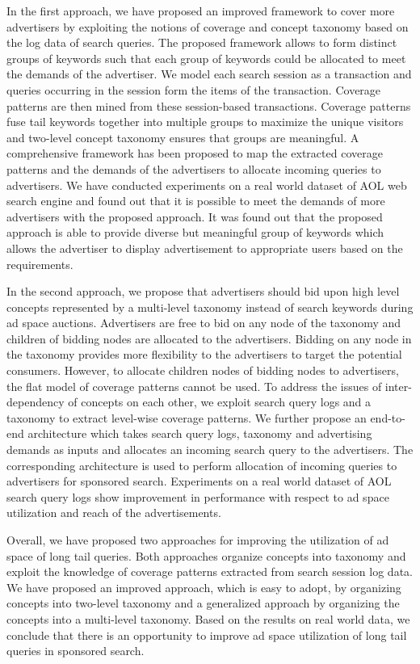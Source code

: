In the first approach, we have proposed an improved framework to cover more advertisers  by exploiting the notions of coverage and concept taxonomy based on the log data of search queries. The proposed framework allows to form distinct groups of keywords such that each group of keywords could be allocated to meet the demands of the advertiser. We model each search session as a transaction and queries occurring in the session form the items of the transaction. Coverage patterns are then mined from these session-based transactions. Coverage patterns fuse tail keywords together into multiple groups to maximize the unique visitors and two-level concept taxonomy  ensures that groups are meaningful. A comprehensive framework has been proposed to map the extracted coverage patterns and the demands of the advertisers to allocate incoming queries to advertisers. We have conducted experiments on a real world dataset of AOL web search engine and found out that it is possible to meet the demands of more advertisers with
the proposed approach. It was found out that the proposed approach is able to provide diverse but meaningful group of keywords which allows the advertiser to display advertisement to appropriate users based on the requirements.


In the second approach, we propose that advertisers should bid upon high level concepts represented by a multi-level taxonomy instead of search keywords during ad space auctions. Advertisers are free to bid on any node of the taxonomy and children of bidding nodes are allocated to the advertisers. Bidding on any node in the taxonomy provides more flexibility to the advertisers to target the potential consumers. However, to allocate children nodes of bidding nodes to advertisers, the flat model of coverage patterns cannot be used.  To address the issues of inter-dependency of concepts on each other, we exploit search query logs and a taxonomy to extract level-wise coverage patterns. We further propose an end-to-end architecture which takes search query logs, taxonomy and advertising demands as inputs and allocates an incoming search query to the advertisers. The corresponding architecture is used to perform allocation of incoming queries to advertisers for sponsored search. Experiments on a real world dataset of AOL search query logs show improvement in performance with respect to ad space utilization and reach of the advertisements.


Overall, we have proposed two approaches for improving the utilization of ad space of long tail queries. Both approaches organize concepts into taxonomy and exploit the knowledge of coverage patterns extracted from search session log data. We have proposed an improved approach, which is easy to adopt,  by organizing concepts into two-level taxonomy and a generalized approach by organizing the concepts into a multi-level taxonomy. Based on the results on real world data, we conclude that there is an opportunity to improve ad space utilization of long tail queries in sponsored search. 
